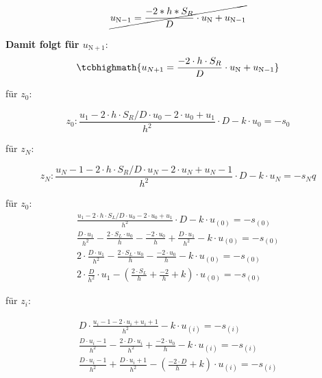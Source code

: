 \begin{equation}
	\cancel{
		u_{\mathrm{N}-1} = \frac{-2*h*S_R}{D} \cdot u_\mathrm{N} + u_{\mathrm{N}-1}
	}
\end{equation}

\begin{qed}
	\textbf{Damit folgt für $u_{\mathrm{N}+1}$}:
	\begin{equation}
	\tcbhighmath{	u_{N+1} = \frac{-2\cdot h\cdot S_R}{D} \cdot u_\mathrm{N} + u_{\mathrm{N}-1}}
	\end{equation}
\end{qed}



für $z_0$:

\begin{equation}
	z_0: \frac{u_1-2\cdot h\cdot S_R/D\cdot u_0-2\cdot u_0+u_1}{h^2} \cdot D-k\cdot u_0 = -s_0
\end{equation}


für $z_N$:

\begin{equation}
	z_N: \frac{u_N-1-2\cdot h\cdot S_R/D\cdot u_N-2\cdot u_N+u_N-1}{h^2}\cdot  D-k\cdot u_N = -s_N
q\end{equation}

für $z_0$:
\begin{equation}
	\begin{split}
		\frac{u_1-2\cdot h\cdot S_L/D\cdot u_0-2\cdot u_0+u_1}{h^2} \cdot D-k\cdot u_(0) = -s_(0)\\
		\frac{D\cdot u_1}{h^2}-\frac{2\cdot S_L\cdot u_0}{h}-\frac{-2\cdot u_0}{h}+\frac{D\cdot u_1}{h^2}-k\cdot u_(0) = -s_(0)\\
		2\cdot \frac{D\cdot u_1}{h^2}-\frac{2\cdot S_L\cdot u_0}{h}-\frac{-2\cdot u_0}{h}-k\cdot u_(0) = -s_(0)\\
		2\cdot \frac{D}{h^2}\cdot u_1-(\frac{2\cdot S_L}{h}+\frac{-2}{h}+k)\cdot u_(0) = -s_(0)
	\end{split}
\end{equation}


für $z_i$:

\begin{equation}
	\begin{split}
		D\cdot \frac{u_i-1-2\cdot u_i+u_i+1}{h^2}-k\cdot u_(i) = -s_(i)\\
		\frac{D\cdot u_i-1}{h^2}-\frac{2\cdot D\cdot u_i}{h^2}+\frac{-2\cdot u_0}{h}-k\cdot u_(i) = -s_(i)\\
		\frac{D\cdot u_i-1}{h^2}+\frac{D\cdot u_i+1}{h^2}-(\frac{-2\cdot D}{h}+k)\cdot u_(i) = -s_(i)\\
	\end{split}
\end{equation}




